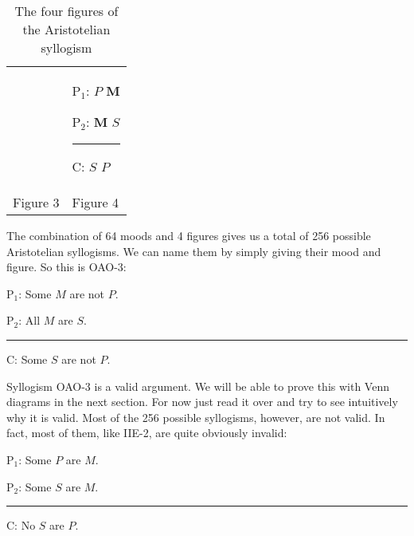 \begin{table}
\begin{mdframed}[style=mytablebox]
\begin{tabu}{p{.5\linewidth}p{.5\linewidth}}
&

\begin{earg}
\item[P$_1$:] $P$ \hspace{1em} \textbf{M}
\item[P$_2$:] \textbf{M} \hspace{1em} $S$
\vspace{-.5em}
\item [] \rule{0.4\linewidth}{.5pt} 
\item[C:] \hspace{.3ex} $S$ \hspace{1em} $P$
\end{earg} 

\\

\hspace{2em} Figure 3

&

\hspace{2em} Figure 4

\end{tabu}
\end{mdframed}
\caption{The four figures of the Aristotelian syllogism}
\label{tab:four_figures}
\end{table}

The combination of 64 moods and 4 figures gives us a total of 256 possible Aristotelian syllogisms. We can name them by simply giving their mood and figure. So this is OAO-3:

\begin{earg}
\item[P$_1$:] Some $M$ are not $P$.
\item[P$_2$:] All $M$ are $S$.
\vspace{-.5em}
\item [] \rule{0.2\linewidth}{.5pt} 
\item[C:] Some $S$ are not $P$.
\end{earg} 

Syllogism OAO-3 is a valid argument. We will be able to prove this with Venn diagrams in the next section. For now just read it over and try to see intuitively why it is valid. Most of the 256 possible syllogisms, however, are not valid.  In fact, most of them, like IIE-2, are quite obviously invalid:

\begin{earg}
\item[P$_1$:] Some $P$ are $M.$
\item[P$_2$:] Some $S$ are $M.$
\vspace{-.5em}
\item [] \rule{0.2\linewidth}{.5pt} 
\item[C:] No $S$ are $P.$
\end{earg} 

